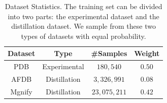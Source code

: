 \begin{table}[t]
    \centering
    \caption{Dataset Statistics. The training set can be divided into two parts: the experimental dataset and the distillation dataset. We sample from these two types of datasets with equal probability.}
    \label{tab:data_stats}
    \begin{tabular}{cccc}
        \toprule
        \textbf{Dataset} & \textbf{Type} & \textbf{\#Samples} & \textbf{Weight} \\
        \midrule
        PDB & Experimental & $180,540$ & $0.50$ \\
        AFDB & Distillation & $3,326,991$ & $0.08$ \\
        Mgnify & Distillation & $23,075,211$ & $0.42$ \\
        \bottomrule
    \end{tabular}
\end{table}


